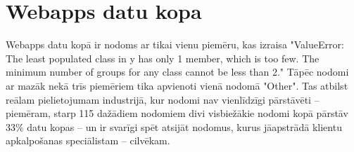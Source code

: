 \section{Webapps datu kopa}


Webapps datu kopā ir nodoms ar tikai vienu piemēru, kas izraisa "ValueError: The least populated class in y has only 1 member, which is too few. The minimum number of groups for any class cannot be less than 2." Tāpēc nodomi ar mazāk nekā trīs piemēriem tika apvienoti vienā nodomā "Other". Tas atbilst reālam pielietojumam industrijā, kur nodomi nav vienlīdzīgi pārstāvēti  -- piemēram, starp 115 dažādiem nodomiem divi visbiežākie nodomi kopā pārstāv 33\% datu kopas \cite{paikens2020} -- un ir svarīgi spēt atsijāt nodomus, kurus jāapstrādā klientu apkalpošanas speciālistam -- cilvēkam.









